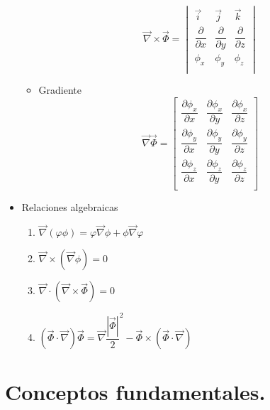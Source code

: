 \begin{itemize}
\begin{itemize}
		\[
		\vec\nabla \times \vec\Phi = \begin{vmatrix}
			\vec i & \vec j & \vec k \\
			\dfrac{\partial}{\partial x} & \dfrac{\partial}{\partial y} & \dfrac{\partial}{\partial z} \\
			\phi_x & \phi_y & \phi_z \\
		\end{vmatrix}
		\]
		\item Gradiente 
		\setlength{\arraycolsep}{1.5pt}
		\renewcommand{\arraystretch}{2}
		\[\vec\nabla  \vec\Phi = \begin{bmatrix}
			\dfrac{\partial \phi_x}{\partial x} & \dfrac{\partial \phi_x}{\partial y} & \dfrac{\partial \phi_x}{\partial z} \\
			\dfrac{\partial \phi_y}{\partial x} & \dfrac{\partial \phi_y}{\partial y} & \dfrac{\partial \phi_y}{\partial z} \\
			\dfrac{\partial \phi_z}{\partial x} & \dfrac{\partial \phi_z}{\partial y} & \dfrac{\partial \phi_z}{\partial z} \\
		\end{bmatrix}\]
		
	\end{itemize}
	\item Relaciones algebraicas
	\begin{enumerate}
		\item $\vec{\nabla}(\varphi \phi) =\varphi\vec{\nabla}\phi+\phi\vec{\nabla}\varphi$
		\item $\vec{\nabla} \times \left(\vec{\nabla} \phi\right)=0$
		\item $\vec{\nabla} \cdot \left(\vec{\nabla} \times \vec{\Phi}\right) =0$
		\item $\left(\vec{\Phi}  \cdot \vec{\nabla}\right)\vec{\Phi}=\vec{\nabla} \dfrac{|\vec\Phi|}{2}^2-\vec\Phi \times \left(\vec{\Phi}  \cdot \vec{\nabla}\right) $ 
	\end{enumerate}
\end{itemize}

\section{Conceptos fundamentales.}

